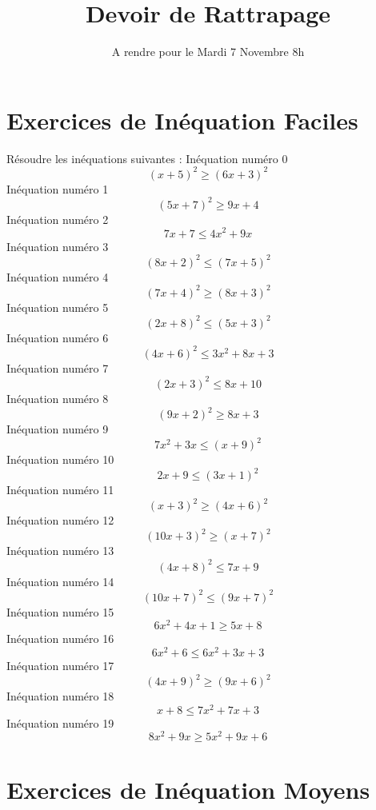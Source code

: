 \documentclass{article}
\title{Devoir de Rattrapage}
\date{A rendre pour le Mardi 7 Novembre 8h}\usepackage{natbib}
\begin{document}
\maketitle
 \section{Exercices de In\'equation Faciles}

 R\'esoudre les in\'equations suivantes : 
In\'equation num\'ero 0 \[\left(x + 5\right)^{2} \geq \left(6 x + 3\right)^{2}\]In\'equation num\'ero 1 \[\left(5 x + 7\right)^{2} \geq 9 x + 4\]In\'equation num\'ero 2 \[7 x + 7 \leq 4 x^{2} + 9 x\]In\'equation num\'ero 3 \[\left(8 x + 2\right)^{2} \leq \left(7 x + 5\right)^{2}\]In\'equation num\'ero 4 \[\left(7 x + 4\right)^{2} \geq \left(8 x + 3\right)^{2}\]In\'equation num\'ero 5 \[\left(2 x + 8\right)^{2} \leq \left(5 x + 3\right)^{2}\]In\'equation num\'ero 6 \[\left(4 x + 6\right)^{2} \leq 3 x^{2} + 8 x + 3\]In\'equation num\'ero 7 \[\left(2 x + 3\right)^{2} \leq 8 x + 10\]In\'equation num\'ero 8 \[\left(9 x + 2\right)^{2} \geq 8 x + 3\]In\'equation num\'ero 9 \[7 x^{2} + 3 x \leq \left(x + 9\right)^{2}\]In\'equation num\'ero 10 \[2 x + 9 \leq \left(3 x + 1\right)^{2}\]In\'equation num\'ero 11 \[\left(x + 3\right)^{2} \geq \left(4 x + 6\right)^{2}\]In\'equation num\'ero 12 \[\left(10 x + 3\right)^{2} \geq \left(x + 7\right)^{2}\]In\'equation num\'ero 13 \[\left(4 x + 8\right)^{2} \leq 7 x + 9\]In\'equation num\'ero 14 \[\left(10 x + 7\right)^{2} \leq \left(9 x + 7\right)^{2}\]In\'equation num\'ero 15 \[6 x^{2} + 4 x + 1 \geq 5 x + 8\]In\'equation num\'ero 16 \[6 x^{2} + 6 \leq 6 x^{2} + 3 x + 3\]In\'equation num\'ero 17 \[\left(4 x + 9\right)^{2} \geq \left(9 x + 6\right)^{2}\]In\'equation num\'ero 18 \[x + 8 \leq 7 x^{2} + 7 x + 3\]In\'equation num\'ero 19 \[8 x^{2} + 9 x \geq 5 x^{2} + 9 x + 6\]
 \section{Exercices de In\'equation Moyens}
\end{document}

